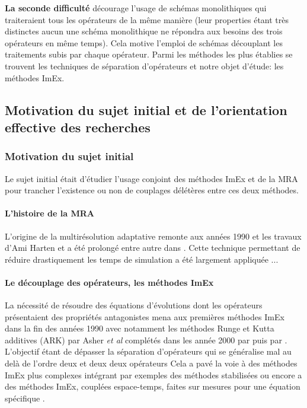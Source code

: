     \textbf{La seconde difficulté} décourage l'usage de schémas monolithiques qui traiteraient tous les opérateurs de la même manière 
    (leur properties étant très distinctes aucun une schéma monolithique ne répondra aux besoins des trois opérateurs en même temps).
    Cela motive l'emploi de schémas découplant les traitements subis par chaque opérateur. Parmi les méthodes les plus établies se trouvent 
    les techniques de séparation d'opérateurs et notre objet d'étude: les méthodes ImEx.

\subsection{Motivation du sujet initial et de l'orientation effective des recherches}
    \subsubsection{Motivation du sujet initial}
    Le sujet initial était d'étudier l'usage conjoint des méthodes ImEx et de la MRA pour trancher l’existence ou non de couplages délétères entre ces deux méthodes.\par 

    \paragraph{L'histoire de la MRA}
    L'origine de la multirésolution adaptative remonte aux années 1990 et les travaux d'Ami Harten \cite{harten1994} et a été prolongé entre autre dans \cite{Kaibara2001,Cohen2003}.
    Cette technique permettant de réduire drastiquement les temps de simulation a été largement appliquée \cite{}...

    \paragraph{Le découplage des opérateurs, les méthodes ImEx}
    La nécessité de résoudre des équations d'évolutions dont les opérateurs présentaient des propriétés antagonistes mena aux premières méthodes ImEx dans la fin des années 1990 
    avec notamment les méthodes Runge et Kutta additives (ARK) par Asher \textit{et al} \cite{ASCHER1997151} complétés dans les année 2000 par \cite{KENNEDY2003139} puis par \cite{FITZHUGH1961445}. 
    L'objectif étant de dépasser la séparation d'opérateurs \cite{Strang1968} qui se généralise mal au delà de l'ordre deux et deux deux opérateurs \cite{}%
    Cela a pavé la voie à des méthodes ImEx plus complexes intégrant par exemples des méthodes stabilisées \cite{Abdulle2013} 
    ou encore a des méthodes ImEx, couplées espace-temps, faites sur mesures pour une équation spécifique \cite{rebou2024}.

